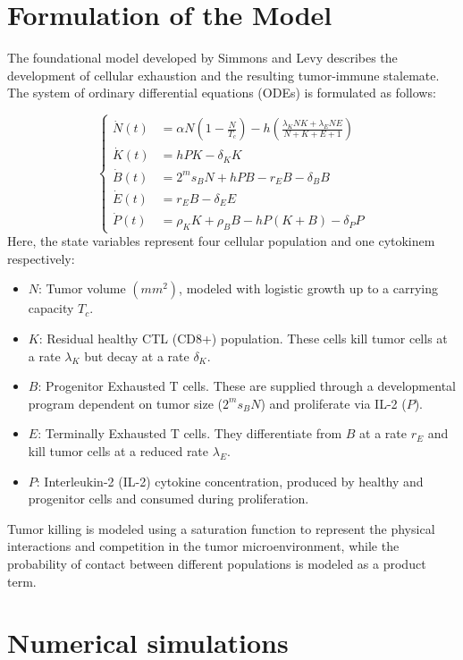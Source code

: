 \documentclass[12pt,a4paper]{article}
\begin{document}
\section{Formulation of the Model}
The foundational model developed by Simmons and Levy \cite{SimmonsLevy} describes the development of cellular exhaustion and the resulting tumor-immune stalemate. The system of ordinary differential equations (ODEs) is formulated as follows:

\begin{equation}
\begin{cases}
    \dot{N}(t) &= \alpha N \left(1 - \frac{N}{T_c}\right) - h \left( \frac{\lambda_K N K + \lambda_E N E}{N + K + E + 1} \right) \\
    \dot{K}(t) &= h P K - \delta_K K \\
    \dot{B}(t) &= 2^m s_B N + h P B - r_E B - \delta_B B \\
    \dot{E}(t) &= r_E B - \delta_E E \\
    \dot{P}(t) &= \rho_K K + \rho_B B - h P (K + B) - \delta_P P
\end{cases}
\end{equation}
Here, the state variables represent four cellular population and one cytokinem respectively:
\begin{itemize}
    \item $N$: Tumor volume $(mm^2)$, modeled with logistic growth up to a carrying capacity $T_c$.
    \item $K$: Residual healthy CTL (CD8+) population. These cells kill tumor cells at a rate $\lambda_K$ but decay at a rate $\delta_K$.
    \item $B$: Progenitor Exhausted T cells. These are supplied through a developmental program dependent on tumor size ($2^m s_B N$) and proliferate via IL-2 ($P$).
    \item $E$: Terminally Exhausted T cells. They differentiate from $B$ at a rate $r_E$ and kill tumor cells at a reduced rate $\lambda_E$.
    \item $P$: Interleukin-2 (IL-2) cytokine concentration, produced by healthy and progenitor cells and consumed during proliferation.
\end{itemize}
Tumor killing is modeled using a saturation function to represent the physical interactions and competition in the tumor microenvironment, while the probability of contact between different populations is modeled as a product term.

\section{Numerical simulations}
\end{document}
